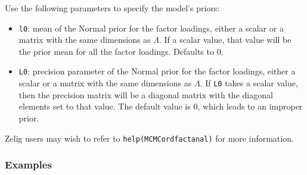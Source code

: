 Use the following parameters to specify the model's priors:  
\begin{itemize}
\item \texttt{l0}: mean of the Normal prior for the factor
loadings, either a scalar or a matrix with the same dimensions as
$\Lambda$.  If a scalar value, that value will be the prior mean for
all the factor loadings. Defaults to 0.

\item \texttt{L0}: precision parameter of the Normal prior 
for the factor loadings, either a scalar or a matrix with the same
dimensions as $\Lambda$.  If \texttt{L0} takes a scalar value, then
the precision matrix will be a diagonal matrix with the diagonal
elements set to that value. The default value is 0, which leads to an
improper prior.
\end{itemize}

Zelig users may wish to refer to \texttt{help(MCMCordfactanal)} for more 
information.



\subsubsection{Examples}

